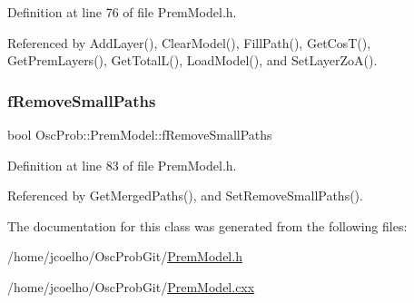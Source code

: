 Definition at line 76 of file Prem\+Model.\+h.



Referenced by Add\+Layer(), Clear\+Model(), Fill\+Path(), Get\+Cos\+T(), Get\+Prem\+Layers(), Get\+Total\+L(), Load\+Model(), and Set\+Layer\+Zo\+A().

\mbox{\label{classOscProb_1_1PremModel_a3973df6f5f2ff219cd2f865b31aacfd2}} 
\subsubsection{\texorpdfstring{f\+Remove\+Small\+Paths}{fRemoveSmallPaths}}
{\footnotesize\ttfamily bool Osc\+Prob\+::\+Prem\+Model\+::f\+Remove\+Small\+Paths\hspace{0.3cm}{\ttfamily [protected]}}



Definition at line 83 of file Prem\+Model.\+h.



Referenced by Get\+Merged\+Paths(), and Set\+Remove\+Small\+Paths().



The documentation for this class was generated from the following files\+:\begin{DoxyCompactItemize}
\item 
/home/jcoelho/\+Osc\+Prob\+Git/\hyperlink{PremModel_8h}{Prem\+Model.\+h}\item 
/home/jcoelho/\+Osc\+Prob\+Git/\hyperlink{PremModel_8cxx}{Prem\+Model.\+cxx}\end{DoxyCompactItemize}
